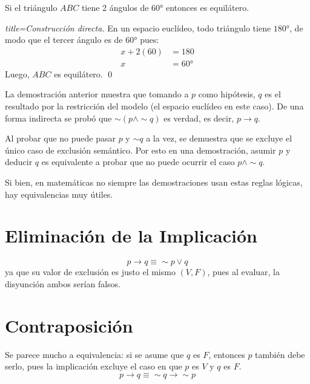   \begin{proposition}[title={Ángulos de 60° implica equilátero}]
  Si el triángulo $ABC$ tiene 2 ángulos de $60°$ entonces es equilátero.
  \end{proposition}

  \begin{proof}[title={Construcción directa}]
  En un espacio euclídeo, todo triángulo tiene $180°$, de modo que el
  tercer ángulo es de $60°$ pues:
  \begin{align}
  x + 2(60) &= 180 \\
  x &= 60°
  \end{align}
  Luego, $ABC$ es equilátero. \qed
  \end{proof}

  \obs La demostración anterior muestra que tomando a $p$ como hipótesis,
  $q$ es el resultado por la restricción del modelo (el espacio euclídeo
  en este caso). De una forma indirecta se probó que $\sim(p \land \sim q)$
  es verdad, es decir, $p \to q$.

  Al probar que no puede pasar $p$ y $\sim q$ a la vez, se demuestra que
  se excluye el único caso de exclusión semántico. Por esto en una
  demostración, asumir $p$ y deducir $q$ es equivalente a probar que no
  puede ocurrir el caso $p \land \sim q$.

  \obs Si bien, en matemáticas no siempre las demostraciones usan estas
  reglas lógicas, hay equivalencias muy útiles.

  \section{Eliminación de la Implicación}

  \begin{definition}[title={Eliminación de la implicación}]
  \begin{equation}
  p \to q \equiv \sim p \lor q
  \end{equation}
  ya que su valor de exclusión es justo el mismo $(V, F)$, pues al
  evaluar, la disyunción ambos serían falsos.
  \end{definition}

  \section{Contraposición}

  \begin{minipage}[t]{0.48\textwidth}
  \begin{definition}[title={Contraposición}]
  Se parece mucho a equivalencia: si se asume que $q$ es $F$, entonces
  $p$ también debe serlo, pues la implicación excluye el caso en que $p$
  es $V$ y $q$ es $F$.
  \begin{equation}
  p \to q \equiv \sim q \to \sim p
  \end{equation}
  \end{definition}
  \end{minipage}

